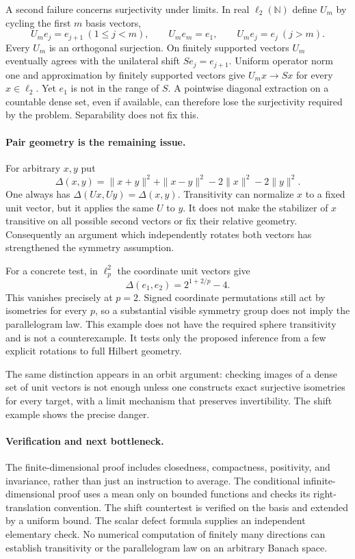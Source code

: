 \documentclass[11pt]{article}
\begin{document}
A second failure concerns surjectivity under limits. In real
$\ell_2(\mathbb N)$ define $U_m$ by cycling the first $m$ basis vectors,
\[
 U_me_j=e_{j+1}\ (1\le j<m),\qquad U_me_m=e_1,
 \qquad U_me_j=e_j\ (j>m).
\]
Every $U_m$ is an orthogonal surjection. On finitely supported vectors
$U_m$ eventually agrees with the unilateral shift $Se_j=e_{j+1}$.
Uniform operator norm one and approximation by finitely supported
vectors give $U_mx\to Sx$ for every $x\in\ell_2$.
Yet $e_1$ is not in the range of $S$. A pointwise diagonal extraction
on a countable dense set, even if available, can therefore lose the
surjectivity required by the problem. Separability does not fix this.

\paragraph{Pair geometry is the remaining issue.}
For arbitrary $x,y$ put
\[
 \Delta(x,y)=\|x+y\|^2+\|x-y\|^2-2\|x\|^2-2\|y\|^2.
\]
One always has $\Delta(Ux,Uy)=\Delta(x,y)$.
Transitivity can normalize $x$ to a fixed unit vector, but it applies
the same $U$ to $y$. It does not make the stabilizer of $x$ transitive
on all possible second vectors or fix their relative geometry.
Consequently an argument which independently rotates both vectors
has strengthened the symmetry assumption.

For a concrete test, in $\ell_p^2$ the coordinate unit vectors give
\[
                 \Delta(e_1,e_2)=2^{1+2/p}-4.
\]
This vanishes precisely at $p=2$. Signed coordinate permutations
still act by isometries for every $p$, so a substantial visible
symmetry group does not imply the parallelogram law. This example
does not have the required sphere transitivity and is not a
counterexample. It tests only the proposed inference from a few
explicit rotations to full Hilbert geometry.

The same distinction appears in an orbit argument: checking images of
a dense set of unit vectors is not enough unless one constructs exact
surjective isometries for every target, with a limit mechanism that
preserves invertibility. The shift example shows the precise danger.

\paragraph{Verification and next bottleneck.}
The finite-dimensional proof includes closedness, compactness,
positivity, and invariance, rather than just an instruction to average.
The conditional infinite-dimensional proof uses a mean only on bounded
functions and checks its right-translation convention. The shift
countertest is verified on the basis and extended by a uniform bound.
The scalar defect formula supplies an independent elementary check.
No numerical computation of finitely many directions can establish
transitivity or the parallelogram law on an arbitrary Banach space.
\end{document}
